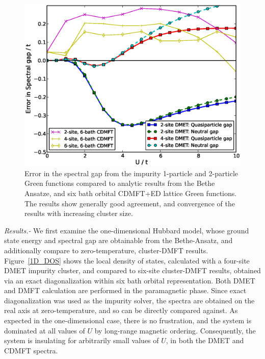\documentclass[aps,twocolumn,nobibnotes]{revtex4}
\begin{document}
\begin{figure}
\begin{center}
    \vspace{-2mm}
\includegraphics[scale=0.425]{Plots/1D_Gap/Hubbard_Gap.eps}
\end{center}
    \vspace{-8mm}
\caption{Error in the spectral gap from the impurity 1-particle and 2-particle Green functions compared to analytic results
from the Bethe Ansatze\cite{Ovchinni1970}, and six bath orbital CDMFT+ED lattice Green functions\cite{Go2009}. The results show generally 
good agreement, and convergence of the results with increasing cluster size.}
\label{1D_GAP}
\end{figure}

\emph{Results.-} We first examine the one-dimensional Hubbard model, whose ground state energy\cite{Lieb68} and spectral gap\cite{Ovchinni1970} are 
obtainable from the Bethe-Ansatz, and additionally compare to
zero-temperature, cluster-DMFT results\cite{Go2009}. Figure~\ref{1D_DOS} shows the local density of states, calculated with a four-site DMET 
impurity cluster, and compared to six-site cluster-DMFT results, obtained via an exact diagonalization within six bath orbital representation. 
Both DMET and DMFT calculation are performed in the paramagnetic phase. 
Since exact diagonalization was used as the impurity solver, 
the spectra are obtained on the real axis at zero-temperature, and so can be directly compared against. As expected in the one-dimensional case, there is no
frustration, and the system is dominated at all values of $U$ by long-range magnetic ordering\cite{Lieb68}. Consequently, 
the system is insulating for arbitrarily small values of $U$, in both the DMET and CDMFT spectra. 
\end{document}
